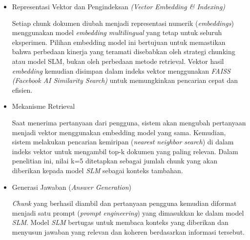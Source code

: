 \begin{itemize}
  \item Representasi Vektor dan Pengindeksan \textit{(Vector Embedding \& Indexing)} \par
  Setiap chunk dokumen diubah menjadi representasi numerik (\textit{embeddings}) menggunakan model \textit{embedding multilingual} yang tetap untuk seluruh eksperimen. Pilihan embedding model ini bertujuan untuk memastikan bahwa perbedaan kinerja yang teramati disebabkan oleh strategi chunking atau model SLM, bukan oleh perbedaan metode retrieval. Vektor hasil \textit{embedding} kemudian disimpan dalam indeks vektor menggunakan \textit{FAISS (Facebook AI Similarity Search)} untuk memungkinkan pencarian cepat dan efisien. 
  \item Mekanisme Retrieval \par
  Saat menerima pertanyaan dari pengguna, sistem akan mengubah pertanyaan menjadi vektor menggunakan embedding model yang sama. Kemudian, sistem melakukan pencarian kemiripan (\textit{nearest neighbor search}) di dalam indeks vektor untuk mengambil top-k dokumen yang paling relevan. Dalam penelitian ini, nilai k=5 ditetapkan sebagai jumlah chunk yang akan diberikan kepada model \textit{SLM} sebagai konteks tambahan. 
  \item Generasi Jawaban (\textit{Answer Generation}) \par
  \textit{Chunk} yang berhasil diambil dan pertanyaan pengguna kemudian diformat menjadi satu prompt (\textit{prompt engineering}) yang dimasukkan ke dalam model \textit{SLM}. Model \textit{SLM} bertugas untuk membaca konteks yang diberikan dan menyusun jawaban yang relevan dan koheren berdasarkan informasi tersebut. 
\end{itemize}

